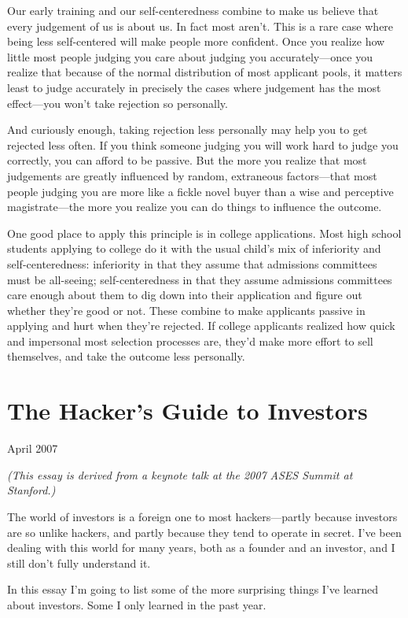 \documentclass[12pt]{book}
\begin{document}
Our early training and our self-centeredness combine to make us believe
that every judgement of us is about us. In fact most aren't. This is a
rare case where being less self-centered will make people more
confident. Once you realize how little most people judging you care
about judging you accurately---once you realize that because of the
normal distribution of most applicant pools, it matters least to judge
accurately in precisely the cases where judgement has the most
effect---you won't take rejection so personally.

And curiously enough, taking rejection less personally may help you to
get rejected less often. If you think someone judging you will work hard
to judge you correctly, you can afford to be passive. But the more you
realize that most judgements are greatly influenced by random,
extraneous factors---that most people judging you are more like a fickle
novel buyer than a wise and perceptive magistrate---the more you realize
you can do things to influence the outcome.

One good place to apply this principle is in college applications. Most
high school students applying to college do it with the usual child's
mix of inferiority and self-centeredness: inferiority in that they
assume that admissions committees must be all-seeing; self-centeredness
in that they assume admissions committees care enough about them to dig
down into their application and figure out whether they're good or not.
These combine to make applicants passive in applying and hurt when
they're rejected. If college applicants realized how quick and
impersonal most selection processes are, they'd make more effort to sell
themselves, and take the outcome less personally.
\chapter{The Hacker's Guide to Investors}

April 2007

\emph{(This essay is derived from a keynote talk at the 2007 ASES Summit
at Stanford.)}

The world of investors is a foreign one to most hackers---partly because
investors are so unlike hackers, and partly because they tend to operate
in secret. I've been dealing with this world for many years, both as a
founder and an investor, and I still don't fully understand it.

In this essay I'm going to list some of the more surprising things I've
learned about investors. Some I only learned in the past year.
\end{document}
